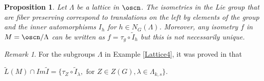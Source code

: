 \documentclass[12pt]{amsart}
\theoremstyle{plain}
\newtheorem{prop}[thm]{Proposition}
\theoremstyle{definition}
\theoremstyle{remark}
\newtheorem{rem}{Remark}
\begin{document}
\begin{prop}
 Let $\Lambda$ be a lattice in $\oscn$. The isometries in the Lie group that are fiber preserving correspond to translations on the left by elements of the group and the inner automorphisms $I_h$ for $h\in N_G(\Lambda)$. Moreover, 
 any isometry $f$ in $M=\oscn/\Lambda$ can be written as $f=\tau_g\circ \widetilde{I}_h$ but this  is not necessarily unique. 
\end{prop}

\begin{rem} For the subgroups $\Lambda$ in Example \ref{Lattice4}, it was proved in \cite{BOV}  that 
	
	$\tilde{L}(M)\cap Im \tilde{I}=\{\tau_Z\circ\widetilde{I}_{\lambda}, \mbox{ for } Z\in Z(G), \lambda\in \Lambda_{k,s}\}$. 
	\end{rem}
	
\end{document}
